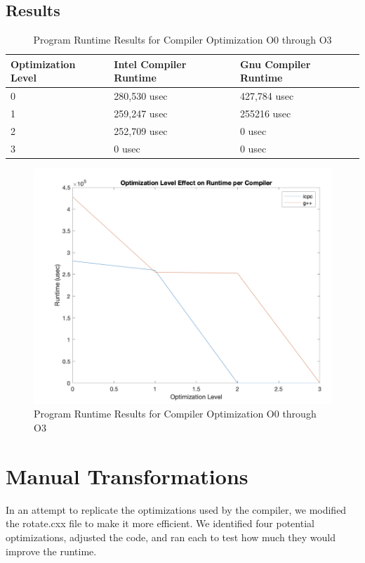 \documentclass{report}
\begin{document}
\subsection*{Results}

\begin{table}[H]
\centering
\begin{tabular}{|l|l|l|}
\hline
\textbf{Optimization Level} & \textbf{Intel Compiler Runtime} & \textbf{Gnu Compiler Runtime} \\ \hline
0 & 280,530 usec & 427,784 usec \\ \hline
1 & 259,247 usec & 255216 usec \\ \hline
2 & 252,709 usec & 0 usec \\ \hline
3 & 0 usec & 0 usec \\ \hline
\end{tabular}
\caption{Program Runtime Results for Compiler Optimization O0 through O3}
\label{tab:table1}
\end{table}

\begin{figure}[H]
\centering
\includegraphics[width=.5\paperwidth]{optimization_graph.png}
\caption{Program Runtime Results for Compiler Optimization O0 through O3}
\end{figure}

\section*{Manual Transformations}
In an attempt to replicate the optimizations used by the compiler, we modified the rotate.cxx file to make it more efficient.  We identified four potential optimizations, adjusted the code, and ran each to test how much they would improve the runtime.
\end{document}
